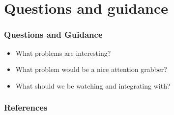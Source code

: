 \documentclass{beamer}
\begin{document}
\section{Questions and guidance}

\begin{frame}
  \frametitle{Questions and Guidance}

  \begin{itemize}
  \item What problems are interesting?
  \item What problem would be a nice attention grabber?
  \item What should we be watching and integrating with?
  \end{itemize}
\end{frame}

\nocite{Coker::Principles-of-R,Haldar:04:Semantic-Remote,Fabrega:1999aa}

\begin{frame}
  \frametitle{References}
  
\end{frame}
\end{document}
